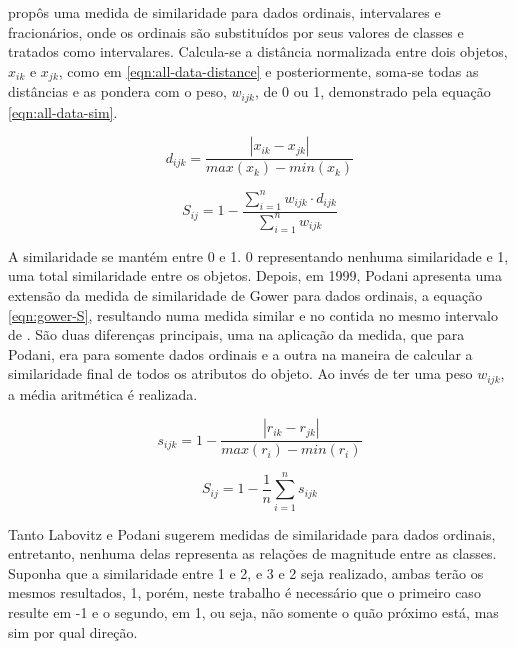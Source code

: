 \documentclass[preprint,12pt]{elsarticle}
\begin{document}
\cite{analysis-cluster} propôs uma medida de similaridade para dados ordinais, intervalares e fracionários, onde os ordinais são substituídos por seus valores de classes e tratados como intervalares. Calcula-se a distância normalizada entre dois objetos, $x_{ik}$ e $x_{jk}$, como em \ref{eqn:all-data-distance} e posteriormente, soma-se todas as distâncias e as pondera com o peso, $w_{ijk}$, de 0 ou 1, demonstrado pela equação \ref{eqn:all-data-sim}.

\begin{equation}
\label{eqn:all-data-distance}
    d_{ijk} =  \frac{|x_{ik} - x_{jk}|}{max(x_k) - min(x_k)}
\end{equation}

\begin{equation}
\label{eqn:all-data-sim}
    S_{ij} = 1 - \frac{\sum^n_{i=1} w_{ijk} \cdot d_{ijk}}{\sum^n_{i=1} w_{ijk}}
\end{equation}

A similaridade se mantém entre 0 e 1. 0 representando nenhuma similaridade e 1, uma total similaridade entre os objetos. Depois, em 1999, Podani \cite{extending-gower-ordinal} apresenta uma extensão da medida de similaridade de Gower para dados ordinais, a equação \ref{eqn:gower-S}, resultando numa medida similar e no contida no mesmo intervalo de \cite{analysis-cluster}. São duas diferenças principais, uma na aplicação da medida, que para Podani, era para somente dados ordinais e a outra na maneira de calcular a similaridade final de todos os atributos do objeto. Ao invés de ter uma peso $w_{ijk}$, a média aritmética é realizada.

\begin{equation}
\label{eqn:gower-s}
    s_{ijk} =  1 - \frac{|r_{ik} - r_{jk}|}{max(r_i) - min(r_i)}
\end{equation}

\begin{equation}
\label{eqn:gower-S}
    S_{ij} =  1 - \frac{1}{n}\sum^n_{i=1}s_{ijk}
\end{equation}

Tanto Labovitz e Podani sugerem medidas de similaridade para dados ordinais, entretanto, nenhuma delas representa as relações de magnitude entre as classes. Suponha que a similaridade entre 1 e 2, e 3 e 2 seja realizado, ambas terão os mesmos resultados, 1, porém, neste trabalho é necessário que o primeiro caso resulte em -1 e o segundo, em 1, ou seja, não somente o quão próximo está, mas sim por qual direção.  
\end{document}
